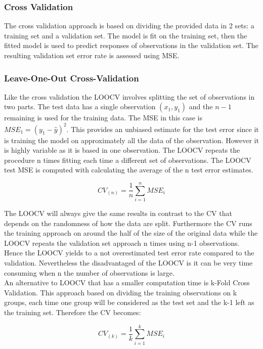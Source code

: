 \documentclass[]{report}
\begin{document}
\subsubsection{Cross Validation}
The cross validation approach is based on dividing the provided data in 2 sets: a training set and a validation set. The model is fit on the training set, then the fitted model is used to predict responses of observations in the validation set. The resulting validation set error rate is assessed using MSE.

\subsubsection{Leave-One-Out Cross-Validation}
Like the cross validation the LOOCV involves splitting the set of observations in two parts. The test data has a single observation $(x_1, y_1)$ and the $n-1$ remaining is used for the training data. The MSE in this case is $MSE_1 =(y_1 - \hat{y})^{2}$. This provides an unbiased estimate for the test error since it is training the model on approximately all the data of the observation. However it is highly variable as it is based in one observation. The LOOCV repeats the procedure n times fitting each time a different set of observations. The LOOCV test MSE is computed with calculating the average of the n test error estimates.
  
\begin{center}
	$$CV_{(n)} = \frac{1}{n} \sum_{i=1}^{n} MSE_{i} $$
\end{center}

The LOOCV will always give the same results in contrast to the CV that depends on the randomness of how the data are split. Furthermore the CV runs the training approach on around the half of the size of the original data while the LOOCV repeats the validation set approach n times using n-1 observations. Hence the LOOCV yields to a not overestimated test error rate compared to the validation. Nevertheless the disadvantaged of the LOOCV is it can be very time consuming when n the number of observations is large.\\

An alternative to LOOCV that has a smaller computation time is k-Fold Cross Validation. This approach based on dividing the training observations on k groups, each time one group will be considered as the test set and the k-1 left as the training set. Therefore the CV becomes:

\begin{center}
	$$CV_{(k)} = \frac{1}{k} \sum_{i=1}^{k} MSE_{i} $$
\end{center}
\end{document}
